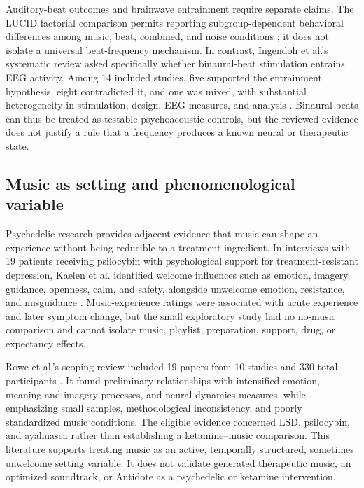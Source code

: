 Auditory-beat outcomes and brainwave entrainment require separate claims. The
LUCID factorial comparison permits reporting subgroup-dependent behavioral
differences among music, beat, combined, and noise conditions
\citep{mallik2022effects}; it does not isolate a universal beat-frequency
mechanism. In contrast, Ingendoh et al.'s systematic review asked specifically
whether binaural-beat stimulation entrains EEG activity. Among 14 included
studies, five supported the entrainment hypothesis, eight contradicted it, and
one was mixed, with substantial heterogeneity in stimulation, design, EEG
measures, and analysis \citep{ingendoh2023binaural}. Binaural beats can thus be
treated as testable psychoacoustic controls, but the reviewed evidence does not
justify a rule that a frequency produces a known neural or therapeutic state.

\subsection{Music as setting and phenomenological variable}
\label{sec:related-setting}

Psychedelic research provides adjacent evidence that music can shape an
experience without being reducible to a treatment ingredient. In interviews
with 19 patients receiving psilocybin with psychological support for
treatment-resistant depression, Kaelen et al. identified welcome influences
such as emotion, imagery, guidance, openness, calm, and safety, alongside
unwelcome emotion, resistance, and misguidance
\citep{kaelen2018hidden}. Music-experience ratings were associated with acute
experience and later symptom change, but the small exploratory study had no
no-music comparison and cannot isolate music, playlist, preparation, support,
drug, or expectancy effects.

Rowe et al.'s scoping review included 19 papers from 10 studies and 330 total
participants \citep{rowe2026psychedelic}. It found preliminary relationships
with intensified emotion, meaning and imagery processes, and neural-dynamics
measures, while emphasizing small samples, methodological inconsistency, and
poorly standardized music conditions. The eligible evidence concerned LSD,
psilocybin, and ayahuasca rather than establishing a ketamine--music
comparison. This literature supports treating music as an active, temporally
structured, sometimes unwelcome setting variable. It does not validate
generated therapeutic music, an optimized soundtrack, or Antidote as a
psychedelic or ketamine intervention.

